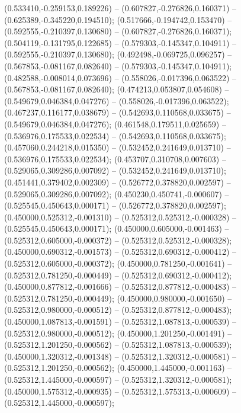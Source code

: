  (0.533410,-0.259153,0.189226) -- (0.607827,-0.276826,0.160371) -- (0.625389,-0.345220,0.194510);
 (0.517666,-0.194742,0.153470) -- (0.592555,-0.210397,0.130680) -- (0.607827,-0.276826,0.160371);
 (0.504119,-0.131795,0.122685) -- (0.579303,-0.145347,0.104911) -- (0.592555,-0.210397,0.130680);
 (0.492498,-0.069725,0.096257) -- (0.567853,-0.081167,0.082640) -- (0.579303,-0.145347,0.104911);
 (0.482588,-0.008014,0.073696) -- (0.558026,-0.017396,0.063522) -- (0.567853,-0.081167,0.082640);
 (0.474213,0.053807,0.054608) -- (0.549679,0.046384,0.047276) -- (0.558026,-0.017396,0.063522);
 (0.467237,0.116177,0.038679) -- (0.542693,0.110568,0.033675) -- (0.549679,0.046384,0.047276);
 (0.461548,0.179511,0.025659) -- (0.536976,0.175533,0.022534) -- (0.542693,0.110568,0.033675);
 (0.457060,0.244218,0.015350) -- (0.532452,0.241649,0.013710) -- (0.536976,0.175533,0.022534);
 (0.453707,0.310708,0.007603) -- (0.529065,0.309286,0.007092) -- (0.532452,0.241649,0.013710);
 (0.451441,0.379402,0.002309) -- (0.526772,0.378820,0.002597) -- (0.529065,0.309286,0.007092);
 (0.450230,0.450741,-0.000607) -- (0.525545,0.450643,0.000171) -- (0.526772,0.378820,0.002597);
 (0.450000,0.525312,-0.001310) -- (0.525312,0.525312,-0.000328) -- (0.525545,0.450643,0.000171);
 (0.450000,0.605000,-0.001463) -- (0.525312,0.605000,-0.000372) -- (0.525312,0.525312,-0.000328);
 (0.450000,0.690312,-0.001573) -- (0.525312,0.690312,-0.000412) -- (0.525312,0.605000,-0.000372);
 (0.450000,0.781250,-0.001641) -- (0.525312,0.781250,-0.000449) -- (0.525312,0.690312,-0.000412);
 (0.450000,0.877812,-0.001666) -- (0.525312,0.877812,-0.000483) -- (0.525312,0.781250,-0.000449);
 (0.450000,0.980000,-0.001650) -- (0.525312,0.980000,-0.000512) -- (0.525312,0.877812,-0.000483);
 (0.450000,1.087813,-0.001591) -- (0.525312,1.087813,-0.000539) -- (0.525312,0.980000,-0.000512);
 (0.450000,1.201250,-0.001491) -- (0.525312,1.201250,-0.000562) -- (0.525312,1.087813,-0.000539);
 (0.450000,1.320312,-0.001348) -- (0.525312,1.320312,-0.000581) -- (0.525312,1.201250,-0.000562);
 (0.450000,1.445000,-0.001163) -- (0.525312,1.445000,-0.000597) -- (0.525312,1.320312,-0.000581);
 (0.450000,1.575312,-0.000935) -- (0.525312,1.575313,-0.000609) -- (0.525312,1.445000,-0.000597);
